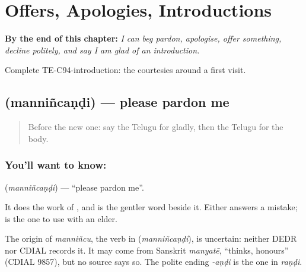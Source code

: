 
\chapter{Offers, Apologies, Introductions}
\label{ch:te-offers-apologies}

\begin{chapteropening}
\textbf{By the end of this chapter:} \emph{I can beg pardon, apologise, offer something, decline politely, and say I am glad of an introduction.}

Complete TE-C94-introduction: the courtesies around a first visit.
\end{chapteropening}

\section[\texorpdfstring{\te{మన్నించండి} (manniñcaṇḍi)}{మన్నించండి (manniñcaṇḍi)}]{ (manniñcaṇḍi) — please pardon me}

\label{lesson:TE-C94-pardon}



\begin{quote}
Before the new one: say the Telugu for gladly, then the Telugu for the body.
\end{quote}

\subsection*{You'll want to know: }
\textbf{} (\emph{manniñcaṇḍi}) — \textquotedblleft{}please pardon me\textquotedblright{}.

It does the work of \textbf{}, and is the gentler word beside it. Either answers a mistake; \textbf{} is the one to use with an elder.

\begin{cousinweb}
The origin of \emph{manniñcu}, the verb in \textbf{} (\emph{manniñcaṇḍi}), is uncertain: neither DEDR nor CDIAL records it. It may come from Sanskrit \emph{manyatē}, \textquotedblleft{}thinks, honours\textquotedblright{} (CDIAL 9857), but no source says so. The polite ending \emph{-aṇḍi} is the one in \emph{raṇḍi}.
\end{cousinweb}

